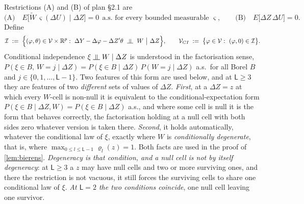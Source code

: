 
\begin{definition}\label{def:admissible}
Restrictions (A) and (B) of plan \S2.1 are
\[
\text{(A)}\quad E\big[\widetilde W\,\varsigma(\Delta U)\;\big|\;\Delta Z\big]=0\ \ \text{a.s. for every bounded measurable }\varsigma,
\qquad
\text{(B)}\quad E\big[\Delta Z\,\Delta U\big]=0 .
\]
Define
\[
\mathcal I\;:=\;\Big\{(\varphi,\theta)\in\mathcal V\times\IR^{p}:\ \Delta Y-\Delta\varphi-\Delta Z'\theta\ \upmodels\ W\ \big|\ \Delta Z\Big\},
\qquad
\mathcal V_{CI}\;:=\;\big\{\varphi\in\mathcal V:\ (\varphi,0)\in\mathcal I\big\}.
\]
Conditional independence $\xi\upmodels W\mid\Delta Z$ is understood in the factorisation sense,
$P(\xi\in B,\,W=j\mid\Delta Z)=P(\xi\in B\mid\Delta Z)\,P(W=j\mid\Delta Z)$ a.s.\ for all Borel $B$ and
$j\in\{0,1,\dots,\mathsf L-1\}$. Two features of this form are used below, and at $\mathsf L\ge3$ they
are features of two \emph{different} sets of values of $\Delta Z$.
\emph{First}, at a $\Delta Z=z$ at which every $W$-cell is non-null it is equivalent to the
conditional-expectation form $P(\xi\in B\mid\Delta Z,W)=P(\xi\in B\mid\Delta Z)$ a.s., and where some
cell is null it is the form that behaves correctly, the factorisation holding at a null cell with both
sides zero whatever version is taken there. \emph{Second}, it holds automatically, whatever the
conditional law of $\xi$, exactly where $W$ is \emph{conditionally degenerate}, that is, where
$\max_{0\le l\le\mathsf L-1}\varrho_l(z)=1$. Both facts are used in the proof of \cref{lem:bierens}.
\emph{Degeneracy is that condition, and a null cell is not by itself degeneracy}: at $\mathsf L\ge3$ a
$z$ may have null cells and two or more surviving ones, and there the restriction is not vacuous, it
still forces the surviving cells to share one conditional law of $\xi$. \emph{At $\mathsf L=2$ the two
conditions coincide}, one null cell leaving one survivor.
\end{definition}

